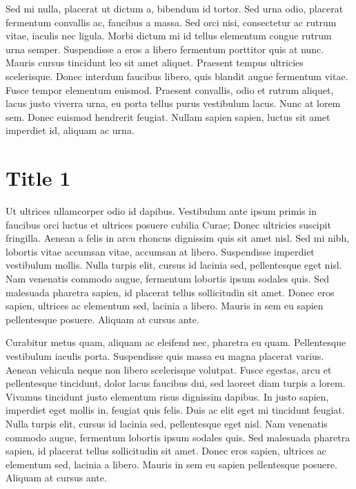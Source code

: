 \documentclass[colTwo]{IIR}
\theoremstyle{definition}
\begin{document}
Sed mi nulla, placerat ut dictum a, bibendum id tortor. Sed urna odio, placerat fermentum convallis ac, faucibus a massa. Sed orci nisi, consectetur ac rutrum vitae, iaculis nec ligula. Morbi dictum mi id tellus elementum congue rutrum urna semper. Suspendisse a eros a libero fermentum porttitor quis at nunc. Mauris cursus tincidunt leo sit amet aliquet. Praesent tempus ultricies scelerisque. Donec interdum faucibus libero, quis blandit augue fermentum vitae. Fusce tempor elementum euismod. Praesent convallis, odio et rutrum aliquet, lacus justo viverra urna, eu porta tellus purus vestibulum lacus. Nunc at lorem sem. Donec euismod hendrerit feugiat. Nullam sapien sapien, luctus sit amet imperdiet id, aliquam ac urna.

\section{Title 1}
Ut ultrices ullamcorper odio id dapibus. Vestibulum ante ipsum primis in faucibus orci luctus et ultrices posuere cubilia Curae; Donec ultricies suscipit fringilla. Aenean a felis in arcu rhoncus dignissim quis sit amet nisl. Sed mi nibh, lobortis vitae accumsan vitae, accumsan at libero. Suspendisse imperdiet vestibulum mollis. Nulla turpis elit, cursus id lacinia sed, pellentesque eget nisl. Nam venenatis commodo augue, fermentum lobortis ipsum sodales quis. Sed malesuada pharetra sapien, id placerat tellus sollicitudin sit amet. Donec eros sapien, ultrices ac elementum sed, lacinia a libero. Mauris in sem eu sapien pellentesque posuere. Aliquam at cursus ante.

Curabitur metus quam, aliquam ac eleifend nec, pharetra eu quam. Pellentesque vestibulum iaculis porta. Suspendisse quis massa eu magna placerat varius. Aenean vehicula neque non libero scelerisque volutpat. Fusce egestas, arcu et pellentesque tincidunt, dolor lacus faucibus dui, sed laoreet diam turpis a lorem. Vivamus tincidunt justo elementum risus dignissim dapibus. In justo sapien, imperdiet eget mollis in, feugiat quis felis. Duis ac elit eget mi tincidunt feugiat. Nulla turpis elit, cursus id lacinia sed, pellentesque eget nisl. Nam venenatis commodo augue, fermentum lobortis ipsum sodales quis. Sed malesuada pharetra sapien, id placerat tellus sollicitudin sit amet. Donec eros sapien, ultrices ac elementum sed, lacinia a libero. Mauris in sem eu sapien pellentesque posuere. Aliquam at cursus ante.
\end{document}

